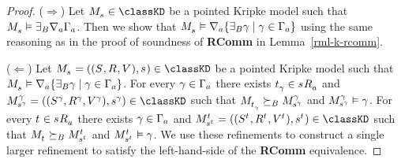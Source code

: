 \begin{proof}
($\Rightarrow$) Let $\kPModel{\kStateS} \in \classKD$ be a pointed Kripke model such that $\kPModel{\kStateS} \entails \somerefsBs \coversA \Gamma_\agentA$.
Then we show that $\kPModel{\kStateS} \entails \coversA \{\somerefsBs \gamma \mid \gamma \in \Gamma_\agentA\}$ using the same reasoning as in the proof of soundness of {\bf RComm} in Lemma~\ref{rml-k-rcomm}.

($\Leftarrow$) Let $\kPModelAndTuple{\kStateS} \in \classKD$ be a pointed Kripke model such that $\kPModel{\kStateS} \entails \coversA \{\somerefsBs \gamma \mid \gamma \in \Gamma_\agentA\}$.
For every $\gamma \in \Gamma_\agentA$ there exists $\kStateT_\gamma \in \kSuccessorsA{\kStateS}$ and $\kPModelAndTuple[\gamma]{\kStateS[\gamma]} \in \classKD$ such that $\kPModel{\kStateT_\gamma} \simulatesBs \kPModel[\gamma]{\kStateS[\gamma]}$ and $\kPModel[\gamma]{\kStateS[\gamma]} \entails \gamma$.
For every $\kStateT \in \kSuccessorsA{\kStateS}$ there exists $\gamma \in \Gamma_\agentA$ and $\kPModelAndTuple[\kStateT]{\kStateS[\kStateT]} \in \classKD$ such that $\kPModel{\kStateT} \simulatesBs \kPModel[\kStateT]{\kStateS[\kStateT]}$ and $\kPModel[\kStateT]{\kStateS[\kStateT]} \entails \gamma$.
We use these refinements to construct a single larger refinement to satisfy the left-hand-side of the {\bf RComm} equivalence.


\end{proof}

